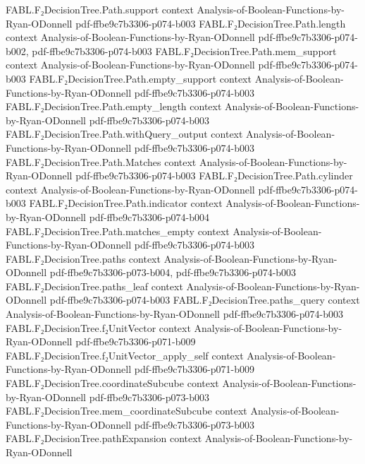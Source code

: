 \begin{theorem}
\proofstep
  {FABL.F₂DecisionTree.Path.support}
  {context}
  {Analysis-of-Boolean-Functions-by-Ryan-ODonnell}
  {pdf-ffbe9c7b3306-p074-b003}
\proofstep
  {FABL.F₂DecisionTree.Path.length}
  {context}
  {Analysis-of-Boolean-Functions-by-Ryan-ODonnell}
  {pdf-ffbe9c7b3306-p074-b002,
    pdf-ffbe9c7b3306-p074-b003}
\proofstep
  {FABL.F₂DecisionTree.Path.mem_support}
  {context}
  {Analysis-of-Boolean-Functions-by-Ryan-ODonnell}
  {pdf-ffbe9c7b3306-p074-b003}
\proofstep
  {FABL.F₂DecisionTree.Path.empty_support}
  {context}
  {Analysis-of-Boolean-Functions-by-Ryan-ODonnell}
  {pdf-ffbe9c7b3306-p074-b003}
\proofstep
  {FABL.F₂DecisionTree.Path.empty_length}
  {context}
  {Analysis-of-Boolean-Functions-by-Ryan-ODonnell}
  {pdf-ffbe9c7b3306-p074-b003}
\proofstep
  {FABL.F₂DecisionTree.Path.withQuery_output}
  {context}
  {Analysis-of-Boolean-Functions-by-Ryan-ODonnell}
  {pdf-ffbe9c7b3306-p074-b003}
\proofstep
  {FABL.F₂DecisionTree.Path.Matches}
  {context}
  {Analysis-of-Boolean-Functions-by-Ryan-ODonnell}
  {pdf-ffbe9c7b3306-p074-b003}
\proofstep
  {FABL.F₂DecisionTree.Path.cylinder}
  {context}
  {Analysis-of-Boolean-Functions-by-Ryan-ODonnell}
  {pdf-ffbe9c7b3306-p074-b003}
\proofstep
  {FABL.F₂DecisionTree.Path.indicator}
  {context}
  {Analysis-of-Boolean-Functions-by-Ryan-ODonnell}
  {pdf-ffbe9c7b3306-p074-b004}
\proofstep
  {FABL.F₂DecisionTree.Path.matches_empty}
  {context}
  {Analysis-of-Boolean-Functions-by-Ryan-ODonnell}
  {pdf-ffbe9c7b3306-p074-b003}
\proofstep
  {FABL.F₂DecisionTree.paths}
  {context}
  {Analysis-of-Boolean-Functions-by-Ryan-ODonnell}
  {pdf-ffbe9c7b3306-p073-b004,
    pdf-ffbe9c7b3306-p074-b003}
\proofstep
  {FABL.F₂DecisionTree.paths_leaf}
  {context}
  {Analysis-of-Boolean-Functions-by-Ryan-ODonnell}
  {pdf-ffbe9c7b3306-p074-b003}
\proofstep
  {FABL.F₂DecisionTree.paths_query}
  {context}
  {Analysis-of-Boolean-Functions-by-Ryan-ODonnell}
  {pdf-ffbe9c7b3306-p074-b003}
\proofstep
  {FABL.F₂DecisionTree.f₂UnitVector}
  {context}
  {Analysis-of-Boolean-Functions-by-Ryan-ODonnell}
  {pdf-ffbe9c7b3306-p071-b009}
\proofstep
  {FABL.F₂DecisionTree.f₂UnitVector_apply_self}
  {context}
  {Analysis-of-Boolean-Functions-by-Ryan-ODonnell}
  {pdf-ffbe9c7b3306-p071-b009}
\proofstep
  {FABL.F₂DecisionTree.coordinateSubcube}
  {context}
  {Analysis-of-Boolean-Functions-by-Ryan-ODonnell}
  {pdf-ffbe9c7b3306-p073-b003}
\proofstep
  {FABL.F₂DecisionTree.mem_coordinateSubcube}
  {context}
  {Analysis-of-Boolean-Functions-by-Ryan-ODonnell}
  {pdf-ffbe9c7b3306-p073-b003}
\proofstep
  {FABL.F₂DecisionTree.pathExpansion}
  {context}
  {Analysis-of-Boolean-Functions-by-Ryan-ODonnell}

\end{theorem}
